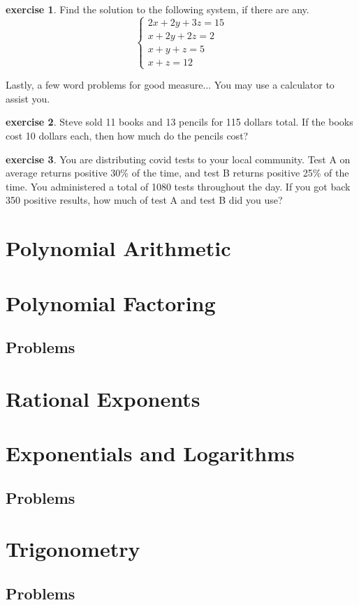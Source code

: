 \documentclass{scrbook}
\theoremstyle{definition}
\newtheorem{exercise}{exercise}[subsection]
\begin{document}
\begin{exercise} Find the solution to the following system, if there are any.
  \[
    \begin{cases}
      2x + 2y + 3z = 15\\
      x + 2y + 2z = 2\\
      x + y + z = 5\\
      x + z = 12
    \end{cases}  
  \]
\end{exercise}

Lastly, a few word problems for good measure... You may use a calculator to assist you.

\begin{exercise}
  Steve sold 11 books and 13 pencils for 115 dollars total. If the books cost 10 dollars each, then how much do the pencils cost?
\end{exercise}

\begin{exercise}
  You are distributing covid tests to your local community. Test A on average returns positive 30\% of the time, and test B returns positive 25\% of the time. You administered a total of 1080 tests throughout the day. If you got back 350 positive results, how much of test A and test B did you use?
\end{exercise}

\section{Polynomial Arithmetic}



\section{Polynomial Factoring}

\subsection{Problems}

\section{Rational Exponents}

\section{Exponentials and Logarithms}

\subsection{Problems}

\section{Trigonometry}

\subsection{Problems}

\printbibliography
\end{document}
